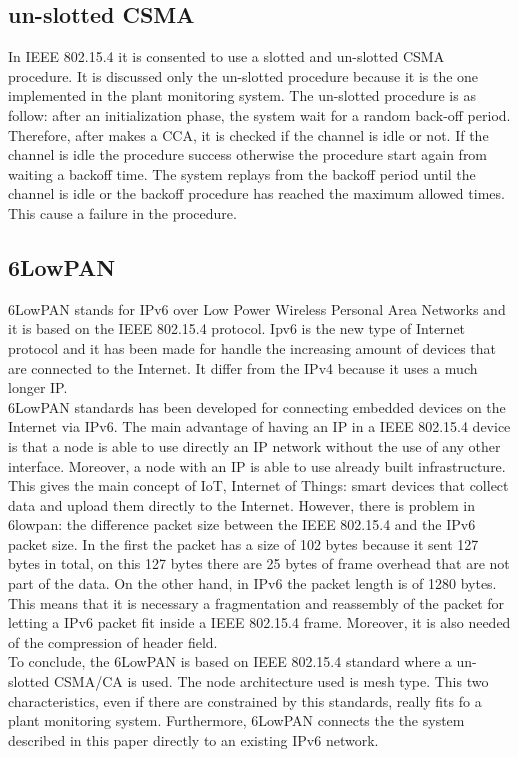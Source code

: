 \subsection{un-slotted CSMA}
In IEEE 802.15.4 it is consented to use a slotted and un-slotted CSMA procedure. It is discussed only the un-slotted procedure because it is the one implemented in the plant monitoring system. The un-slotted procedure is as follow: after an initialization phase, the system wait for a random back-off period. Therefore, after makes a CCA, it is checked if the channel is idle or not. If the channel is idle the procedure success otherwise the procedure start again from waiting a backoff time. The system replays from the backoff period until the channel is idle or the backoff procedure has reached the maximum allowed times. This cause a failure in the procedure.\cite{slide}\\


\subsection{6LowPAN}
6LowPAN stands for IPv6 over Low Power Wireless Personal Area Networks and it is based on the IEEE 802.15.4 protocol. Ipv6 is the new type of Internet protocol and it has been made for handle the increasing amount of devices that are connected to the Internet. It differ from the IPv4 because it uses a much longer IP.\cite{6lowpan}\\
6LowPAN standards has been developed for connecting embedded devices on the Internet via IPv6.\cite{why}
The main advantage of having an IP in a IEEE 802.15.4 device is that a node is able to use directly an IP network without the use of any other interface. Moreover, a node with an IP is able to use already built infrastructure.\cite{6lowpan} This gives the main concept of IoT, Internet of Things: smart devices that collect data and upload them directly to the Internet.
However, there is  problem in 6lowpan: the difference packet size between the IEEE 802.15.4 and the IPv6 packet size. In the first the packet has a size of 102 bytes because it sent 127 bytes in total, on this 127 bytes there are 25 bytes of frame overhead that are not part of the data. On the other hand, in IPv6 the packet length is of 1280 bytes. This means that it is necessary a fragmentation and reassembly of the packet for letting a IPv6 packet fit inside a IEEE 802.15.4 frame. Moreover, it is also needed of the compression of header field.\cite{slide} \cite{6lowpan}\\
To conclude, the 6LowPAN is based on IEEE 802.15.4 standard where a un-slotted CSMA/CA is used. The node architecture used is mesh type. \cite{6lowpan} This two characteristics, even if there are constrained by this standards, really fits fo a plant monitoring system.
Furthermore, 6LowPAN connects the the system described in this paper directly to an existing IPv6 network.
